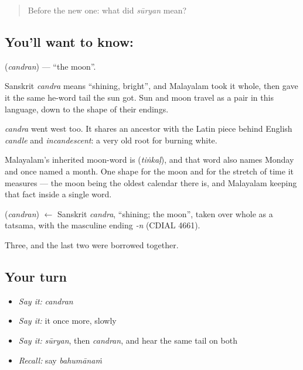 \begin{quote}
Before the new one: what did \emph{sūryan} mean?
\end{quote}

\subsection*{You'll want to know: }
\textbf{} (\emph{candran}) — \textquotedblleft{}the moon\textquotedblright{}.

Sanskrit \emph{candra} means \textquotedblleft{}shining, bright\textquotedblright{}, and Malayalam took it whole, then gave it the same he-word tail the sun got. Sun and moon travel as a pair in this language, down to the shape of their endings.

\emph{candra} went west too. It shares an ancestor with the Latin piece behind English \emph{candle} and \emph{incandescent}: a very old root for burning white.

Malayalam's inherited moon-word is  (\emph{tiṅkaḷ}), and that word also names Monday and once named a month. One shape for the moon and for the stretch of time it measures — the moon being the oldest calendar there is, and Malayalam keeping that fact inside a single word.

\begin{cousinweb}
\textbf{} (\emph{candran}) $\leftarrow$ Sanskrit \emph{candra}, \textquotedblleft{}shining; the moon\textquotedblright{}, taken over whole as a tatsama, with the masculine ending \emph{-n} (CDIAL 4661).
\end{cousinweb}

\begin{grammarlens}[title={What you've built}]
Three, and the last two were borrowed together.
\end{grammarlens}

\subsection*{Your turn}
\begin{itemize}
\raggedright
  \item \emph{Say it:} \emph{candran}
  \item \emph{Say it:} it once more, slowly
  \item \emph{Say it:} \emph{sūryan}, then \emph{candran}, and hear the same tail on both
  \item \emph{Recall:} say \emph{bahumānaṁ}
\end{itemize}

